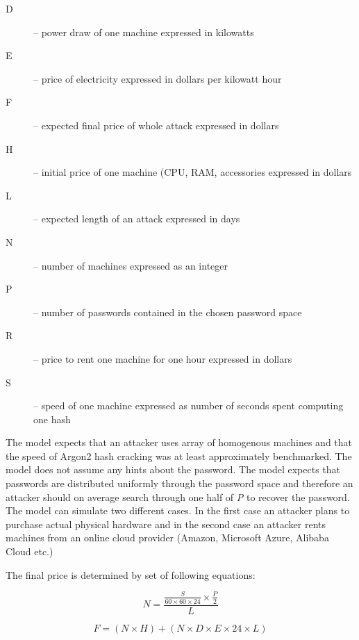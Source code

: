 \documentclass[nolof]{fithesis3}
\begin{document}
\begin{description}
\item[D] -- power draw of one machine expressed in kilowatts

\item[E] -- price of electricity expressed in dollars per kilowatt hour

\item[F] -- expected final price of whole attack expressed in dollars

\item[H] -- initial price of one machine (CPU, RAM, accessories expressed in dollars

\item[L] -- expected length of an attack expressed in days

\item[N] -- number of machines expressed as an integer

\item[P] -- number of passwords contained in the chosen password space

\item[R] -- price to rent one machine for one hour expressed in dollars

\item[S] -- speed of one machine expressed as number of seconds spent computing one hash
\end{description}

The model expects that an attacker uses array of homogenous machines and that the speed of Argon2 hash cracking was at least approximately benchmarked. The model does not assume any hints about the password. The model expects that passwords are distributed uniformly through the password space and therefore an attacker should on average search through one half of \emph{P} to recover the password. The model can simulate two different cases. In the first case an attacker plans to purchase actual physical hardware and in the second case an attacker rents machines from an online cloud provider (Amazon, Microsoft Azure, Alibaba Cloud etc.)

The final price is determined by set of following equations:

\begin{equation}
\label{eq1}
N = \frac{\frac{S}{60 \times 60 \times 24} \times \frac{P}{2}}{L}
\end{equation}

\begin{equation}
\label{eq2}
F = ( N \times H ) + ( N \times D \times E \times 24 \times L)
\end{equation}
\end{document}

